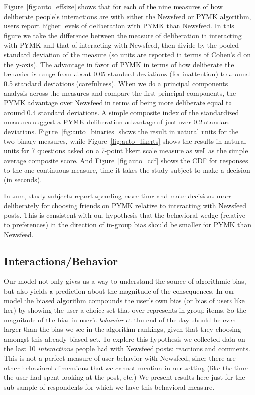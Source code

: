 \documentclass[12pt,letterpaper]{article}
\begin{document}
Figure~\ref{fig:auto_effsize} shows that for each of the nine measures of how deliberate people's interactions are with either the Newsfeed or PYMK algorithm, users report higher levels of deliberation with PYMK than Newsfeed. In this figure we take the difference between the measure of deliberation in interacting with PYMK and that of interacting with Newsfeed, then divide by the pooled standard deviation of the measure (so units are reported in terms of Cohen's d on the y-axis). The advantage in favor of PYMK in terms of how deliberate the behavior is range from about 0.05 standard deviations (for inattention) to around 0.5 standard deviations (carefulness). When we do a principal components analysis across the measures and compare the first principal components, the PYMK advantage over Newsfeed in terms of being more deliberate equal to around 0.4 standard deviations. A simple composite index of the standardized measures suggest a PYMK deliberation advantage of just over 0.2 standard deviations. Figure~\ref{fig:auto_binaries} shows the result in natural units for the two binary measures, while Figure~\ref{fig:auto_likerts} shows the results in natural units for 7 questions asked on a 7-point likert scale measure as well as the simple average composite score. And Figure~\ref{fig:auto_cdf} shows the CDF for responses to the one continuous measure, time it takes the study subject to make a decision (in seconds).

In sum, study subjects report spending more time and make decisions more deliberately for choosing friends on PYMK relative to interacting with Newsfeed posts. This is consistent with our hypothesis that the behavioral wedge (relative to preferences) in the direction of in-group bias should be smaller for PYMK than Newsfeed.

\subsection{Interactions/Behavior}
Our model not only gives us a way to understand the source of algorithmic bias, but also yields a prediction about the magnitude of the consequences. In our model the biased algorithm compounds the user's own bias (or bias of users like her) by showing the user a choice set that over-represents in-group items. So the magnitude of the bias in user's \emph{behavior} at the end of the day should be even larger than the bias we see in the algorithm rankings, given that they choosing amongst this already biased set. To explore this hypothesis we collected data on the last 10 \emph{interactions} people had with Newsfeed posts: reactions and comments. This is not a perfect measure of user behavior with Newsfeed, since there are other behavioral dimensions that we cannot mention in our setting (like the time the user had spent looking at the post, etc.) We present results here just for the sub-sample of respondents for which we have this behavioral measure.
\end{document}
